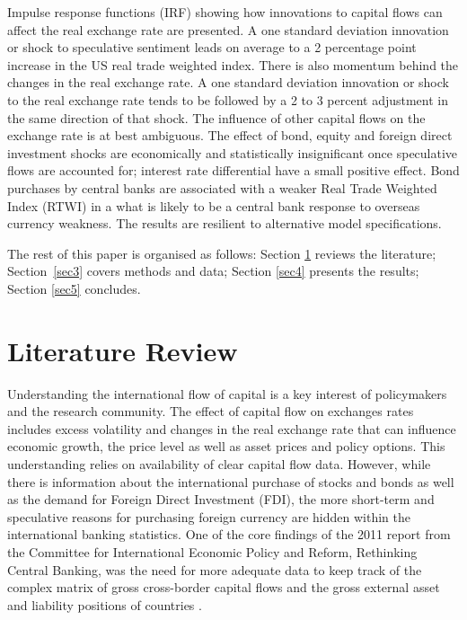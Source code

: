 \documentclass[jrfm,article,accept,moreauthors,pdftex]{Definitions/mdpi}
\begin{document}
Impulse response functions (IRF) showing how innovations to capital flows can affect the real exchange rate are presented. A one standard deviation innovation or shock to speculative sentiment leads on average to a 2 percentage point increase in the US real trade weighted index. There is also momentum behind the changes in the real exchange rate.  A one standard deviation innovation or shock to the real exchange rate tends to be followed by a 2 to 3 percent adjustment in the same direction of that shock. The influence of other capital flows on the exchange rate is at best ambiguous.  The effect of bond, equity and foreign direct investment shocks are economically and statistically insignificant once speculative flows are accounted for; interest rate differential have a small positive effect. Bond purchases by central banks are associated with a weaker Real Trade Weighted Index (RTWI) in a what is likely to be a central bank response to overseas currency weakness. The results are resilient to alternative model specifications. 

The rest of this paper is organised as follows: Section \ref{sec2} reviews the literature; \mbox{Section~\ref{sec3}} covers methods and data; Section \ref{sec4} presents the results; Section \ref{sec5} concludes. 
 
\section{Literature Review}\label{sec2}

Understanding the international flow of capital is a key interest of policymakers and the research community.  The effect of capital flow on exchanges rates includes excess volatility and changes in the real exchange rate that can influence economic growth, the price level as well as asset prices and policy options. This understanding relies on availability of clear capital flow data.  However, while there is information about the international purchase of stocks and bonds as well as the demand for Foreign Direct Investment (FDI), the more short-term and speculative reasons for purchasing foreign currency are hidden within the international banking statistics.  One of the core findings of the 2011 report from the Committee for International Economic Policy and Reform, Rethinking Central Banking, was the need for more adequate data to keep track of the complex matrix of gross cross-border capital flows and the gross external asset and liability positions of countries \mbox{\citep{CIERP2012}}. 
\end{document}
